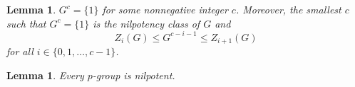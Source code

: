 \documentclass{dcthesis}
\newcommand{\defi}[1]{\textsf{#1}}
\numberwithin{equation}{section}
\newtheorem{lemma}[equation]{Lemma}
\theoremstyle{definition}
\newtheorem{definition}[equation]{Definition}
\theoremstyle{remark}
\newtheorem{example}[equation]{Example}
\begin{document}
{{{\begin{lemma}
      $G^c=\{1\}$ for some nonnegative integer $c$.
      Moreover,
      the smallest $c$ such that $G^c=\{1\}$
      is the nilpotency class of $G$ and
      \[
        Z_i(G)\leq G^{c-i-1}\leq Z_{i+1}(G)
      \]
      for all $i\in \{0,1,\dots,c-1\}$.
    \end{lemma}
    \begin{lemma}
      \label{lem:pgroupsarenilpotent}
      Every $p$-group is nilpotent.
    \end{lemma}
  }
}}
\end{document}
